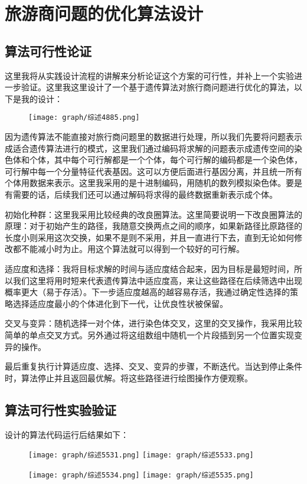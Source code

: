 \documentclass{cjc}
\begin{document}
\section{旅游商问题的优化算法设计}
\subsection{算法可行性论证}
这里我将从实践设计流程的讲解来分析论证这个方案的可行性，并补上一个实验进一步验证。这里我这里设计了一个基于遗传算法对旅行商问题进行优化的算法，以下是我的设计：
\begin{figure}
  \centering
  \texttt{[image: graph/综述4885.png]}
\end{figure}

因为遗传算法不能直接对旅行商问题里的数据进行处理，所以我们先要将问题表示成适合遗传算法进行的模式，这里我们通过编码将求解的问题表示成遗传空间的染色体和个体，其中每个可行解都是一个个体，每个可行解的编码都是一个染色体，可行解中每一个分量特征代表基因。这可以方便后面进行基因分离，并且统一所有个体用数据来表示。这里我采用的是十进制编码，用随机的数列模拟染色体。要是有需要的话，后续我们还可以通过解码将求得的最终数据重新表示成个体。

初始化种群：这里我采用比较经典的改良圈算法。这里简要说明一下改良圈算法的原理：对于初始产生的路径，我随意交换两点之间的顺序，如果新路径比原路径的长度小则采用这次交换，如果不是则不采用，并且一直进行下去，直到无论如何修改都不能减小时为止。用这个算法就可以得到一个较好的可行解。

适应度和选择：我将目标求解的时间与适应度结合起来，因为目标是最短时间，所以我们这里将用时短来代表遗传算法中适应度高，来让这些路径在后续筛选中出现概率更大（易于存活）。下一步适应度越高的越容易存活，我通过确定性选择的策略选择适应度最小的个体进化到下一代，让优良性状被保留。

交叉与变异：随机选择一对个体，进行染色体交叉，这里的交叉操作，我采用比较简单的单点交叉方式。另外通过将这组数组中随机一个片段插到另一个位置实现变异的操作。

最后重复执行计算适应度、选择、交叉、变异的步骤，不断迭代。当达到停止条件时，算法停止并且返回最优解。将这些路径进行绘图操作方便观察。

\subsection{算法可行性实验验证}
设计的算法代码运行后结果如下：
\begin{figure}
  \centering
  \texttt{[image: graph/综述5531.png]}
  \texttt{[image: graph/综述5533.png]}
\end{figure}
\begin{figure}
  \centering
  \texttt{[image: graph/综述5534.png]}
  \texttt{[image: graph/综述5535.png]}
\end{figure}
\end{document}
